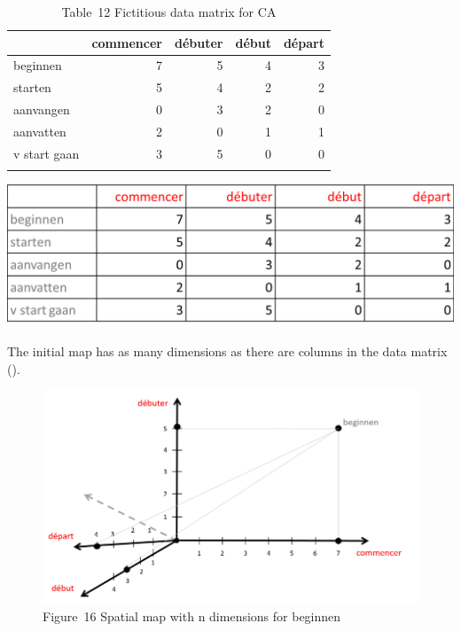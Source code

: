 \begin{table}\caption{Table~12  Fictitious data matrix for CA\label{tab:key:}}
\begin{tabular}{lrrrr}
\lsptoprule
& commencer & d\'{e}buter & d\'ebut & d\'epart\\\midrule
beginnen     & 7 & 5 & 4 & 3\\
starten      & 5 & 4 & 2 & 2\\
aanvangen    & 0 & 3 & 2 & 0\\
aanvatten    & 2 & 0 & 1 & 1\\
v start gaan & 3 & 5 & 0 & 0\\
\lspbottomrule
\end{tabular}
\includegraphics[height=.3\textheight]{figures/Vandevoorde2-img15.png}
\end{table}

The initial map has as many dimensions as there are columns in the data matrix ().



  
\begin{figure}
\includegraphics[height=.3\textheight]{figures/Vandevoorde2-img16.png}
 


\caption{
Figure~16  Spatial map with n dimensions for beginnen}
\end{figure}


